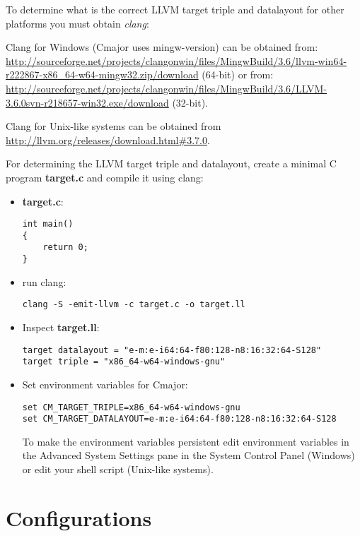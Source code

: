 \documentclass[oneside, a4paper, 11pt]{article}
\begin{document}
To determine what is the correct LLVM target triple and datalayout for other platforms you must obtain \emph{clang}:

Clang for Windows (Cmajor uses mingw-version) can be obtained from:\\
\url{http://sourceforge.net/projects/clangonwin/files/MingwBuild/3.6/llvm-win64-r222867-x86_64-w64-mingw32.zip/download}
(64-bit) or from:\\
\url{http://sourceforge.net/projects/clangonwin/files/MingwBuild/3.6/LLVM-3.6.0svn-r218657-win32.exe/download} (32-bit).

Clang for Unix-like systems can be obtained from \url{http://llvm.org/releases/download.html#3.7.0}.

For determining the LLVM target triple and datalayout, create a minimal C program \textbf{target.c} and compile it using clang:

\begin{itemize}
\item \textbf{target.c}:
\begin{verbatim}
int main()
{
    return 0;
}
\end{verbatim}

\item run clang:
\begin{verbatim}
clang -S -emit-llvm -c target.c -o target.ll
\end{verbatim}

\item Inspect \textbf{target.ll}:
\begin{verbatim}
target datalayout = "e-m:e-i64:64-f80:128-n8:16:32:64-S128"
target triple = "x86_64-w64-windows-gnu"
\end{verbatim}

\item Set environment variables for Cmajor:
\begin{verbatim}
set CM_TARGET_TRIPLE=x86_64-w64-windows-gnu
set CM_TARGET_DATALAYOUT=e-m:e-i64:64-f80:128-n8:16:32:64-S128
\end{verbatim}

To make the environment variables persistent edit environment variables
in the Advanced System Settings pane in the System Control Panel (Windows) or
edit your shell script (Unix-like systems).

\end{itemize}

\section{Configurations}
\end{document}
